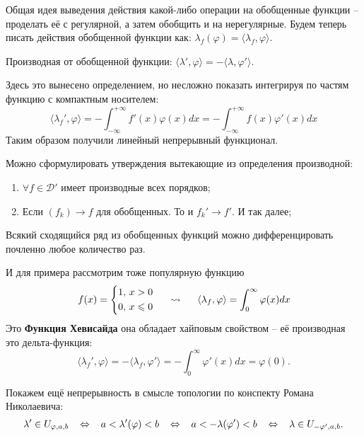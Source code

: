 Общая идея выведения действия какой-либо операции на обобщенные функции -- проделать её с регулярной, а затем обобщить и на нерегулярные. Будем теперь писать действия обобщенной функции как: $\lambda_f(\varphi) = \langle \lambda_f, \varphi\rangle$.

\begin{to_def}
	Производная от обобщенной функции: $\langle \lambda', \varphi \rangle  = - \langle \lambda, \varphi'\rangle$.
\end{to_def}
Здесь это вынесено определением, но несложно показать интегрируя по частям функцию с компактным носителем:
\begin{equation*}
	\langle \lambda_f', \varphi \rangle = - \int_{-\infty}^{+\infty} f'(x)\varphi(x) d x = - \int_{-\infty}^{+\infty} f(x) \varphi'(x)d x
\end{equation*}
Таким образом получили линейный непрерывный функционал.

Можно сформулировать утверждения вытекающие из определения производной:
\begin{enumerate}
	\item $\forall f \in \mathcal{D}'$ имеет производные всех порядков;
	\item Если $(f_k)\to f$ для обобщенных. То и $f_k' \to f'$. И так далее;
\end{enumerate}
 
 \begin{to_lem}
 	Всякий сходящийся ряд из обобщенных функций можно дифференцировать почленно любое количество раз.
 \end{to_lem}

 И для примера рассмотрим тоже популярную функцию
 \begin{equation*}
 	f(x) = \left\{
 	\begin{aligned}
 		&1, \, x > 0\\
 		&0, \, x \leq 0
 	\end{aligned}\right.
 	\hspace{0.5 cm}
 	\leadsto
 	\hspace{0.5 cm}
 	\langle \lambda_f,\varphi\rangle = \int_{0}^{\infty} \varphi(x) d x
 \end{equation*}
 Это \textbf{Функция Хевисайда} она обладает хайповым свойством -- её производная это дельта-функция:
 \begin{equation*}
 	\langle \lambda_f', \varphi\rangle = - \langle \lambda_f, \varphi'\rangle = - \int_{0}^{\infty} \varphi'(x) d x = \varphi(0).
 \end{equation*}

Покажем ещё непрерывность в смысле топологии по конспекту Романа Николаевича:
\begin{equation*}
	\lambda' \in U_{\varphi,a,b} 
	\hspace{0.3 cm}
	\Leftrightarrow
	\hspace{0.3 cm}
	a <\lambda'(\varphi) < b 
	\hspace{0.3 cm}
	\Leftrightarrow
	\hspace{0.3 cm}
	a < - \lambda(\varphi') < b
	\hspace{0.3 cm}
	\Leftrightarrow
	\hspace{0.3 cm}
	\lambda \in U_{- \varphi', a, b}.
\end{equation*}
